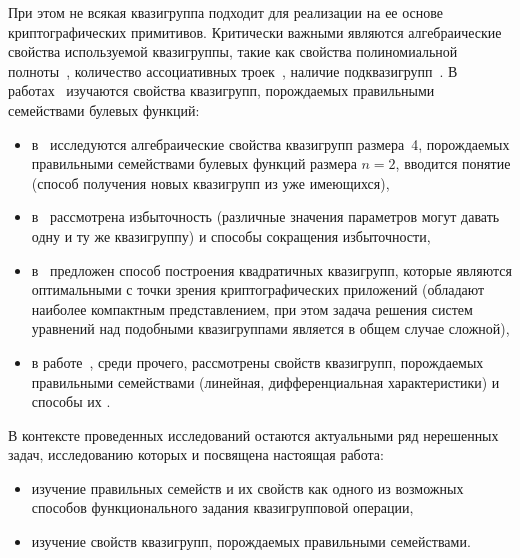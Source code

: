     При этом не всякая квазигруппа подходит для реализации на ее основе криптографических примитивов.
    Критически важными являются алгебраические свойства используемой квазигруппы, такие как свойства полиномиальной полноты~\autocite{hagemann, nipkow1990unification, horvath2008, artamonov2016characterization}, количество ассоциативных троек~\autocite{kepka1980note, kotzig83, ass_summary}, наличие подквазигрупп~\autocite{sobyanin19, galatenko21subquasi}.
    В работах~\autocite{piven18, piven19, galatenko20quad, shvaryov24} изучаются свойства квазигрупп, порождаемых правильными семействами булевых функций:
    \begin{itemize}
        \item в~\autocite{piven18} исследуются алгебраические свойства квазигрупп размера~4, порождаемых правильными семействами булевых функций размера $n = 2$, вводится понятие  (способ получения новых квазигрупп из уже имеющихся),
        \item в~\autocite{piven19} рассмотрена избыточность  (различные значения параметров могут давать одну и ту же квазигруппу) и способы сокращения избыточности,
        \item в~\autocite{galatenko20quad} предложен способ построения квадратичных квазигрупп, которые являются оптимальными с точки зрения криптографических приложений (обладают наиболее компактным представлением, при этом задача решения систем уравнений над подобными квазигруппами является в общем случае сложной),
        \item в работе~\autocite{shvaryov24}, среди прочего, рассмотрены  свойств квазигрупп, порождаемых правильными семействами (линейная, дифференциальная характеристики) и способы их .
    \end{itemize}

    В контексте проведенных исследований остаются актуальными ряд нерешенных задач, исследованию которых и посвящена настоящая работа:
    \begin{itemize}
        \item изучение правильных семейств и их свойств как одного из возможных способов функционального задания квазигрупповой операции,
        \item изучение свойств квазигрупп, порождаемых правильными семействами.
    \end{itemize}

\ifsynopsis
\else
\fi

